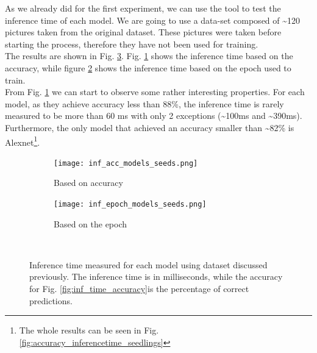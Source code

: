 As we already did for the first experiment, we can use the tool to test the inference time of each model. We are going to use a data-set composed of \textasciitilde120 pictures taken from the original dataset. These pictures were taken before starting the process, therefore they have not been used for training. \\
The results are shown in Fig. \ref{fig:inf_time_epoch_seeds}. Fig. \ref{fig:inf_acc_models_seeds} shows the inference time based on the accuracy, while figure \ref{fig:inf_epoch_models_seeds} shows the inference time based on the epoch used to train. \\
From Fig. \ref{fig:inf_acc_models_seeds} we can start to observe some rather interesting properties. For each model, as they achieve accuracy less than 88\%, the inference time is rarely measured to be more than 60 ms with only 2 exceptions (\textasciitilde100ms and \textasciitilde390ms). Furthermore, the only model that achieved an accuracy smaller than \textasciitilde82\% is Alexnet\footnote{The whole results can be seen in Fig. \ref{fig:accuracy_inferencetime_seedlings}}.
\begin{figure}[h]
     \begin{subfigure}{0.5\textwidth}
	    \texttt{[image: inf\_acc\_models\_seeds.png]}
	    \caption{Based on accuracy}
         \label{fig:inf_acc_models_seeds}
     \end{subfigure}
     \hfill
     \begin{subfigure}{0.5\textwidth}
	    \texttt{[image: inf\_epoch\_models\_seeds.png]}
	    \caption{Based on the epoch}
        \label{fig:inf_epoch_models_seeds}
     \end{subfigure}\\
     \caption[Inference time measured for each model]{Inference time measured for each model using dataset discussed previously. The inference time is in milliseconds, while the accuracy for Fig. \ref{fig:inf_time_accuracy}is the percentage of correct predictions.}
        \label{fig:inf_time_epoch_seeds}
\end{figure}



